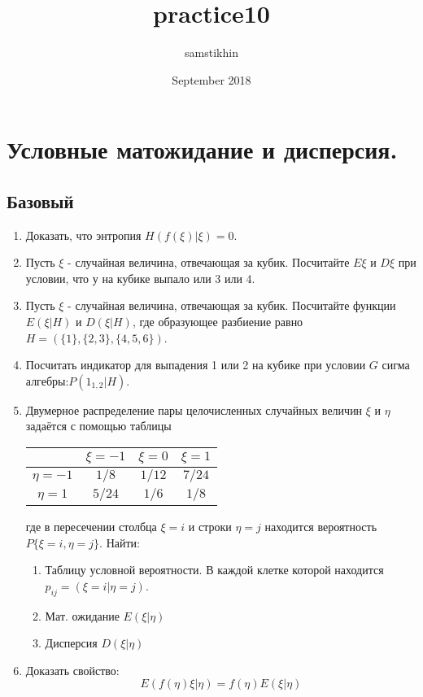 \documentclass[a4paper, 14pt]{extarticle}
\title{practice10}
\author{samstikhin}
\date{September 2018}
\begin{document}
\section*{Условные матожидание и дисперсия.}
\subsection*{Базовый}
\begin{enumerate}

\item Доказать, что энтропия $H(f(\xi)|\xi) = 0$.

\item Пусть $\xi$ - случайная величина, отвечающая за кубик. Посчитайте $E\xi$ и $D\xi$ при условии, что у на кубике выпало или 3 или 4.

\item Пусть $\xi$ - случайная величина, отвечающая за кубик. Посчитайте функции $E(\xi|H)$ и $D(\xi|H)$, где образующее разбиение равно $H = (\{1\}, \{2,3\}, \{4,5,6\})$.

\item Посчитать индикатор для выпадения 1 или 2 на кубике при условии $G$ сигма алгебры:$P(1_{1,2}|H)$. 

\item 
Двумерное распределение пары целочисленных случайных величин $\xi$ и $\eta$ задаётся с помощью таблицы

\begin{center}
\begin{tabular}{|c|c|c|c|}
\hline
 & $\xi = -1$ & $\xi = 0$ & $\xi = 1$\\
\hline
$\eta = -1$ & $1/8$ & $1/12$ & $7/24$\\ 
\hline
$\eta = 1$ & $5/24$ & $1/6$ & $1/8$\\ 
\hline
\end{tabular}


\end{center}
где в пересечении столбца $\xi = i$ и строки $\eta = j$ находится вероятность $P\lbrace{\xi = i, \eta = j\rbrace}$. Найти:

\begin{enumerate}
    \item Таблицу условной вероятности. В каждой клетке которой находится $p_{ij} = (\xi=i|\eta=j)$.
    \item Мат. ожидание $E(\xi|\eta)$
    \item Дисперсия $D(\xi|\eta)$
\end{enumerate}

\item Доказать свойство:
    $$E(f(\eta)\xi|\eta) = f(\eta)E(\xi|\eta)$$

\end{enumerate}
\newpage
\end{document}
